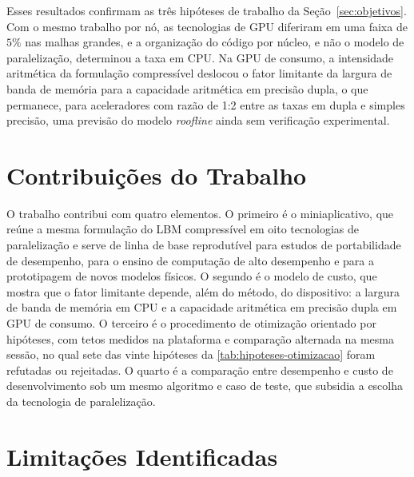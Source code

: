 Esses resultados confirmam as três hipóteses de trabalho da Seção~\ref{sec:objetivos}.
Com o mesmo trabalho por nó, as tecnologias de GPU diferiram em uma faixa de \(5\%\) nas malhas grandes, e a organização do código por núcleo, e não o modelo de paralelização, determinou a taxa em CPU.
Na GPU de consumo, a intensidade aritmética da formulação compressível deslocou o fator limitante da largura de banda de memória para a capacidade aritmética em precisão dupla, o que permanece, para aceleradores com razão de 1:2 entre as taxas em dupla e simples precisão, uma previsão do modelo \textit{roofline} ainda sem verificação experimental.


\section{Contribuições do Trabalho}\label{sec:contribuicoes-do-trabalho}

O trabalho contribui com quatro elementos.
O primeiro é o miniaplicativo, que reúne a mesma formulação do LBM compressível em oito tecnologias de paralelização e serve de linha de base reprodutível para estudos de portabilidade de desempenho, para o ensino de computação de alto desempenho e para a prototipagem de novos modelos físicos.
O segundo é o modelo de custo, que mostra que o fator limitante depende, além do método, do dispositivo: a largura de banda de memória em CPU e a capacidade aritmética em precisão dupla em GPU de consumo.
O terceiro é o procedimento de otimização orientado por hipóteses, com tetos medidos na plataforma e comparação alternada na mesma sessão, no qual sete das vinte hipóteses da \autoref{tab:hipoteses-otimizacao} foram refutadas ou rejeitadas.
O quarto é a comparação entre desempenho e custo de desenvolvimento sob um mesmo algoritmo e caso de teste, que subsidia a escolha da tecnologia de paralelização.


\section{Limitações Identificadas}\label{sec:limitacoes-identificadas}

